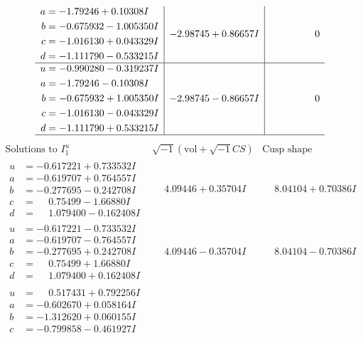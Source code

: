 \documentclass[1p]{elsarticle_modified}
\theoremstyle{definition}
\newcommand{\I}{\sqrt{-1}}
\begin{document}
$$\begin{array}{c|c|c}
\begin{aligned}
a &= -1.79246 + 0.10308 I \\
b &= -0.675932 - 1.005350 I \\
c &= -1.016130 + 0.043329 I \\
d &= -1.111790 - 0.533215 I\end{aligned}
 & -2.98745 + 0.86657 I & \phantom{-0.000000 } 0 \\ \hline\begin{aligned}
u &= -0.990280 - 0.319237 I \\
a &= -1.79246 - 0.10308 I \\
b &= -0.675932 + 1.005350 I \\
c &= -1.016130 - 0.043329 I \\
d &= -1.111790 + 0.533215 I\end{aligned}
 & -2.98745 - 0.86657 I & \phantom{-0.000000 } 0\\
 \hline 
 \end{array}$$\newpage$$\begin{array}{c|c|c}  
\text{Solutions to }I^u_{1}& \I (\text{vol} + \sqrt{-1}CS) & \text{Cusp shape}\\
 \hline 
\begin{aligned}
u &= -0.617221 + 0.733532 I \\
a &= -0.619707 + 0.764557 I \\
b &= -0.277695 - 0.242708 I \\
c &= \phantom{-}0.75499 - 1.66880 I \\
d &= \phantom{-}1.079400 - 0.162408 I\end{aligned}
 & \phantom{-}4.09446 + 0.35704 I & \phantom{-}8.04104 + 0.70386 I \\ \hline\begin{aligned}
u &= -0.617221 - 0.733532 I \\
a &= -0.619707 - 0.764557 I \\
b &= -0.277695 + 0.242708 I \\
c &= \phantom{-}0.75499 + 1.66880 I \\
d &= \phantom{-}1.079400 + 0.162408 I\end{aligned}
 & \phantom{-}4.09446 - 0.35704 I & \phantom{-}8.04104 - 0.70386 I \\ \hline\begin{aligned}
u &= \phantom{-}0.517431 + 0.792256 I \\
a &= -0.602670 + 0.058164 I \\
b &= -1.312620 + 0.060155 I \\
c &= -0.799858 - 0.461927 I \\

\end{aligned}
\end{array}$$
\end{document}
